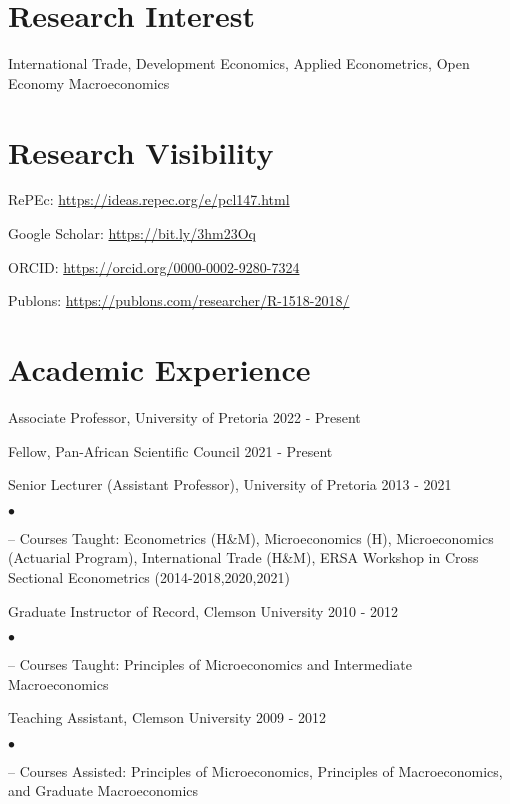 \documentclass[margin,line]{res}                          %
\newenvironment{list1}{
  \begin{list}{\ding{113}}{%
      \setlength{\itemsep}{0.4em}
      \setlength{\parsep}{0in} \setlength{\parskip}{0in}
      \setlength{\topsep}{0in} \setlength{\partopsep}{0in} 
      \setlength{\leftmargin}{0.17in}}}{\end{list}}
\newenvironment{list2}{
  \begin{list}{$\bullet$}{%
      \setlength{\itemsep}{.2em}
      \setlength{\parsep}{0in} \setlength{\parskip}{0in}
      \setlength{\topsep}{.1em} \setlength{\partopsep}{0in} 
      \setlength{\leftmargin}{0.2in}}}{\end{list}}
\begin{document}
\begin{resume}
\section{\sc Research Interest}
\begin{list1}
\item[] International Trade, Development Economics, Applied Econometrics, Open Economy Macroeconomics
\end{list1}

\section{\sc Research Visibility}
\begin{list1}
	\item[] RePEc: \url{https://ideas.repec.org/e/pcl147.html}
	\item[] Google Scholar: \url{https://bit.ly/3hm23Oq}
	\item[] ORCID: \url{https://orcid.org/0000-0002-9280-7324}
	\item[] Publons: \url{https://publons.com/researcher/R-1518-2018/}
\end{list1}

\section{\sc Academic Experience}
\begin{list1}
\item[] Associate Professor, University of Pretoria \hfill 2022 - Present
\item[] Fellow, Pan-African Scientific Council \hfill 2021 - Present
\item[] Senior Lecturer (Assistant Professor), University of Pretoria  \hfill 2013 - 2021 \newline  \vspace*{-.15in}
	\begin{list2}
		\item[--] Courses Taught: Econometrics (H\&M), Microeconomics (H), Microeconomics (Actuarial Program), International Trade (H\&M), ERSA Workshop in Cross Sectional Econometrics (2014-2018,2020,2021)
	\end{list2}
\item[]  Graduate Instructor of Record, Clemson University \hfill 2010 - 2012 \newline  \vspace*{-.15in}
	\begin{list2}
		\item[--] Courses Taught: Principles of Microeconomics and Intermediate Macroeconomics
	\end{list2}
\item[] Teaching Assistant, Clemson University \hfill 2009 - 2012 \newline  \vspace*{-.15in}
	\begin{list2}
		\item[--] Courses Assisted: Principles of Microeconomics, Principles of Macroeconomics, and Graduate Macroeconomics 
	\end{list2}
\end{list1}


\end{resume}
\end{document}
